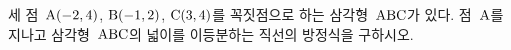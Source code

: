 세 점~$\mathrm{A}(-2{,}\mkern3mu\mathopen{}4)$, $\mathrm{B}(-1{,}\mkern3mu\mathopen{}2)$, $\mathrm{C}(3{,}\mkern3mu\mathopen{}4)$를 꼭짓점으로 하는 삼각형~$\mathrm{ABC}$가 있다. 점~$\mathrm{A}$를 지나고 삼각형~$\mathrm{ABC}$의 넓이를 이등분하는 직선의 방정식을 구하시오.

